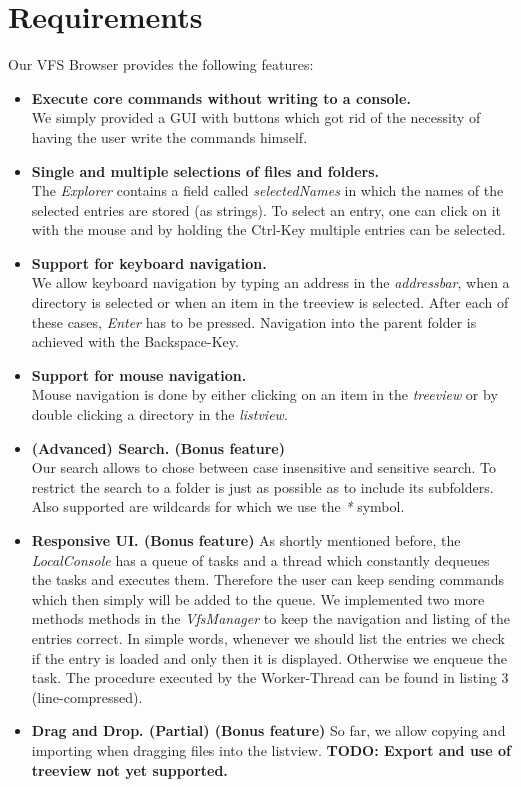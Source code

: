 \documentclass[a4paper,12pt]{article}
\begin{document}
\section{Requirements}
Our VFS Browser provides the following features:
\begin{itemize}
\item \textbf{Execute core commands without writing to a console.} \\
	We simply provided a GUI with buttons which got rid of the necessity of having the user write the commands himself.
\item \textbf{Single and multiple selections of files and folders.} \\
	The \emph{Explorer} contains a field called \emph{selectedNames} in which the names of the selected entries are stored (as strings). To select an 			entry, one can click on it with the mouse and by holding the Ctrl-Key multiple entries can be selected.
\item \textbf{Support for keyboard navigation.} \\
	We allow keyboard navigation by typing an address in the \emph{addressbar}, when a directory is selected or when an item in the treeview is selected. 			After 	each of these cases, \emph{Enter} has to be pressed. Navigation into the parent folder is achieved with the Backspace-Key.
\item \textbf{Support for mouse navigation.} \\
	Mouse navigation is done by either clicking on an item in the \emph{treeview} or by double clicking a directory in the \emph{listview}.
\item \textbf{(Advanced) Search. (Bonus feature) } \\
	Our search allows to chose between case insensitive and sensitive search. To restrict the search to a folder is just as possible as to include its subfolders. 		Also supported are wildcards for which we use the \emph{*} symbol.
\item \textbf {Responsive UI. (Bonus feature)}
	As shortly mentioned before, the \emph{LocalConsole} has a queue of tasks and a thread which constantly dequeues the tasks and executes them. 		Therefore the user can keep sending commands which then simply will be added to the queue. We implemented two more methods methods in 			the \emph{VfsManager} to keep the navigation and listing of the entries correct. In simple words, whenever we should list the entries we check if 			the entry is 	loaded and only then it is displayed. Otherwise we enqueue the task. The procedure executed by the Worker-Thread can be found 			in listing 3 (line-compressed).
\item \textbf{Drag and Drop. (Partial) (Bonus feature)}
	So far, we allow copying and importing when dragging files into the listview. \textbf{TODO: Export and use of treeview not yet supported.}
\end{itemize}
\end{document}
